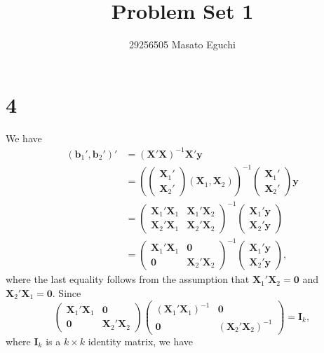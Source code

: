 \documentclass[a4paper,11pt]{article}
\title{\vspace{-20mm}Problem Set 1}
\author{29256505 Masato Eguchi}
\date{}
\begin{document}
\maketitle

\section*{4}
We have
\begin{align*}
    (\bm{b}_1',\bm{b}_2')'&=(\bm{X}'\bm{X})^{-1}\bm{X}'\bm{y}\\
    &=\left(\begin{pmatrix}\bm{X}_1'\\\bm{X}_2'\end{pmatrix}(\bm{X}_1,\bm{X}_2)\right)^{-1}\begin{pmatrix}\bm{X}_1'\\\bm{X}_2'\end{pmatrix}\bm{y}\\
    &=\begin{pmatrix}\bm{X}_1'\bm{X}_1&\bm{X}_1'\bm{X}_2\\\bm{X}_2'\bm{X}_1&\bm{X}_2'\bm{X}_2\end{pmatrix}^{-1}\begin{pmatrix}\bm{X}_1'\bm{y}\\\bm{X}_2'\bm{y}\end{pmatrix}\\
    &=\begin{pmatrix}\bm{X}_1'\bm{X}_1&\bm{0}\\\bm{0}&\bm{X}_2'\bm{X}_2\end{pmatrix}^{-1}\begin{pmatrix}\bm{X}_1'\bm{y}\\\bm{X}_2'\bm{y}\end{pmatrix},
\end{align*}
where the last equality follows from the assumption that $\bm{X}_1'\bm{X}_2=\bm{0}$ and $\bm{X}_2'\bm{X}_1=\bm{0}$. Since 
\begin{equation*}
    \begin{pmatrix}\bm{X}_1'\bm{X}_1&\bm{0}\\\bm{0}&\bm{X}_2'\bm{X}_2\end{pmatrix}\begin{pmatrix}(\bm{X}_1'\bm{X}_1)^{-1}&\bm{0}\\\bm{0}&(\bm{X}_2'\bm{X}_2)^{-1}\end{pmatrix}=\bm{I}_k,
\end{equation*}
where $\bm{I}_k$ is a $k\times k$ identity matrix, we have
\end{document}
